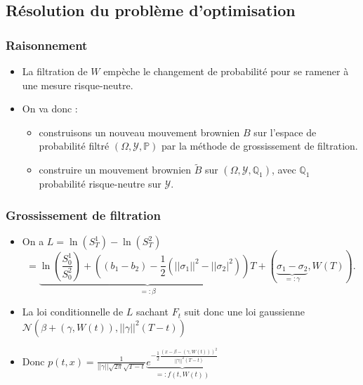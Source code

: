 \documentclass{beamer}
\begin{document}
\subsection{Résolution du problème d'optimisation}
\begin{frame}
\frametitle{Raisonnement}
\begin{itemize}
\item La filtration de $W$ empèche le changement de probabilité pour se ramener à une mesure risque-neutre.
\item On va donc : 
\begin{itemize}
\item construisons un nouveau mouvement brownien $B$ sur l'espace de probabilité filtré  $(\Omega, \mathcal{Y}, \mathbb{P})$ par la méthode de grossissement de filtration.\\
\item construire un mouvement brownien $\tilde{B}$ sur $(\Omega, \mathcal{Y}, \mathbb{Q}_1)$, avec $\mathbb{Q}_1$ probabilité risque-neutre sur $\mathcal{Y}$.
\end{itemize}
\end{itemize} 
\end{frame}


\begin{frame}
\frametitle{Grossissement de filtration}
\begin{itemize}
\item On a $L = \ln(S^1_T) - \ln(S^2_T)$
\begin{equation*}
= \underbrace{\ln ( \frac{S_0^1}{S_0^2} ) + ( ( b_1 - b_2 ) - \frac{1}{2} (||\sigma_1||^2 - ||\sigma_2|^2 ) ) T}_{=: \beta} + ( \underbrace{\sigma_1 - \sigma_2}_{=: \gamma}, W ( T ) ).
\end{equation*}
\item La loi conditionnelle de $L$ sachant $F_t$ suit donc une loi gaussienne $\mathcal{N} \left( \beta + \left( \gamma, W \left( t \right) \right), ||\gamma||^2 \left( T - t \right) \right)$
\item Donc $p \left( t, x \right) = \frac{1}{ ||\gamma|| \sqrt{2 \pi} \sqrt{T - t}} \underbrace{e^{-\frac{1}{2} \frac{\left( x - \beta - \left( \gamma, W \left( t \right) \right) \right)^2}{||\gamma||^2 \left( T - t \right)}}}_{ =: f \left( t, W \left( t \right) \right)}$
\end{itemize}
\end{frame}
\end{document}
